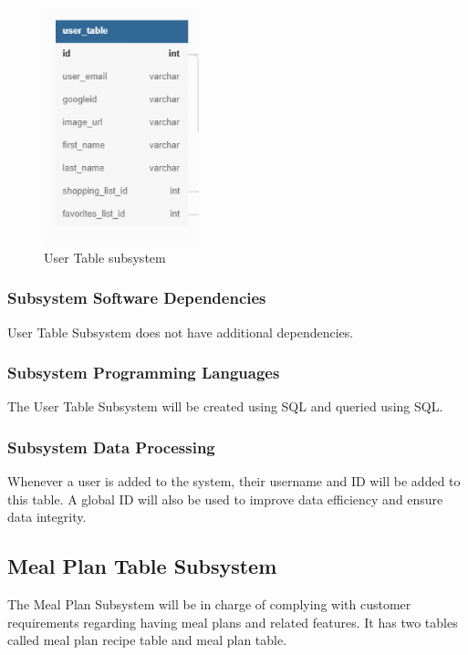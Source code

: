 \begin{figure}[h!]
	\centering
 	\includegraphics[width=0.40\textwidth]{images/user_table.png}
 \caption{User Table subsystem }
\end{figure}

\subsubsection{Subsystem Software Dependencies}
User Table Subsystem does not have additional dependencies.

\subsubsection{Subsystem Programming Languages}
The User Table Subsystem will be created using SQL and queried using SQL.

\subsubsection{Subsystem Data Processing}
Whenever a user is added to the system, their username and ID will be added to this table. A global ID will also be used to improve data efficiency and ensure data integrity. 

\subsection{Meal Plan Table Subsystem}
The Meal Plan Subsystem will be in charge of complying with customer requirements regarding having meal plans and related features. It has two tables called meal plan recipe table and meal plan table.

